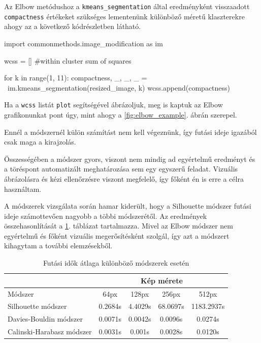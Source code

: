 Az Elbow metódushoz a \texttt{kmeans\_segmentation} által eredményként visszaadott \texttt{compactness} értékeket szükséges lementenünk különböző méretű klaszterekre ahogy az a következő kódrészletben látható.
\begin{python}
import commonmethods.image_modification as im

wcss = []   #within cluster sum of squares

for k in range(1, 11):
    compactness, _, _, _ = \
        im.kmeans_segmentation(resized_image, k)
    wcss.append(compactness)
\end{python}

Ha a \texttt{wcss} listát \texttt{plot} segítségével ábrázoljuk, meg is kaptuk az Elbow grafikonunkat pont úgy, mint ahogy a \ref{fig:elbow_example}. ábrán szerepel.

Ennél a módszernél külön számítást nem kell végeznünk, így futási ideje igazából csak maga a kirajzolás.

Összességében a módszer gyors, viszont nem mindig ad egyértelmű eredményt és a töréspont automatizált meghatározása sem egy egyszerű feladat. Vizuális ábrázolásra és kézi ellenőrzésre viszont megfelelő, így főként én is erre a célra használtam.


A módszerek vizsgálata során hamar kiderült, hogy a Silhouette módszer futási ideje számottevően nagyobb a többi módszerétől. Az eredmények összehasonlítását a \ref{tab:size_runtimes}. táblázat tartalmazza. Mivel az Elbow módszer nem egyértelmű és főként vizuális megerősítésként szolgál, így azt a módszert kihagytam a további elemzésekből.

\begin{table}[h]
\centering
\caption{Futási idők átlaga különböző módszerek esetén}
\label{tab:size_runtimes}
\medskip
\begin{tabular}{|l|c|c|c|c|}
\cline{2-5}
 \multicolumn{1}{c|}{} & \multicolumn{4}{c|}{Kép mérete} \\
 \hline
 Módszer & 64px & 128px & 256px & 512px \\
\hline
Silhouette módszer & 0.2684s & 4.4029s & 68.0697s & 1183.2937s \\
Davies-Bouldin módszer & 0.0071s & 0.0042s & 0.0096s & 0.0274s \\
Calinski-Harabasz módszer & 0.0031s & 0.001s & 0.0028s & 0.0120s \\
\hline
\end{tabular}
\end{table}

